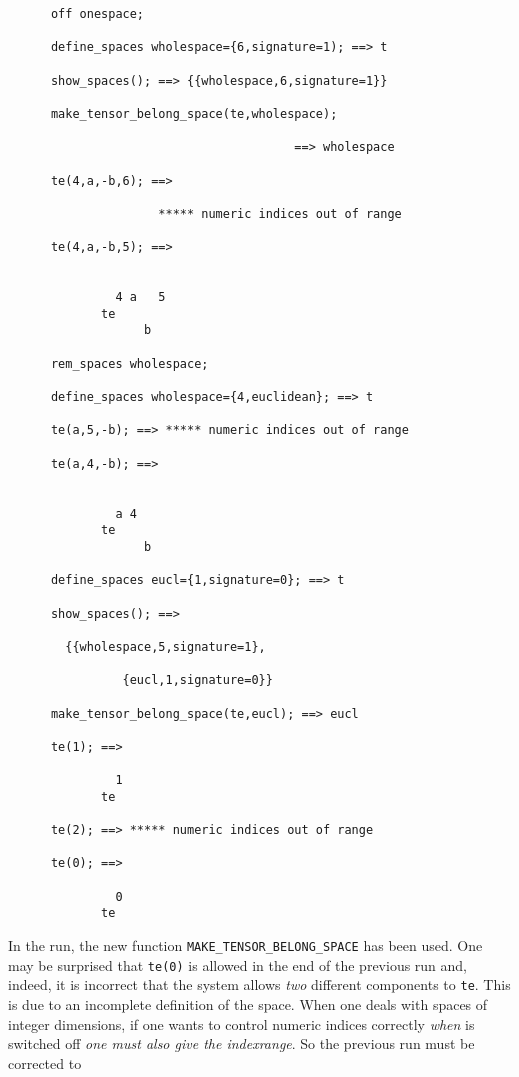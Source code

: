 \begin{verbatim}
      off onespace;

      define_spaces wholespace={6,signature=1); ==> t

      show_spaces(); ==> {{wholespace,6,signature=1}}

      make_tensor_belong_space(te,wholespace);

                                        ==> wholespace

      te(4,a,-b,6); ==>

                     ***** numeric indices out of range

      te(4,a,-b,5); ==>


               4 a   5
             te
                   b

      rem_spaces wholespace;

      define_spaces wholespace={4,euclidean}; ==> t

      te(a,5,-b); ==> ***** numeric indices out of range

      te(a,4,-b); ==>


               a 4
             te
                   b

      define_spaces eucl={1,signature=0}; ==> t

      show_spaces(); ==> 

        {{wholespace,5,signature=1},
 
                {eucl,1,signature=0}}

      make_tensor_belong_space(te,eucl); ==> eucl

      te(1); ==>

               1
             te

      te(2); ==> ***** numeric indices out of range

      te(0); ==> 

               0
             te
\end{verbatim} 
In the run, the new function 
\texttt{MAKE\_TENSOR\_BELONG\_SPACE}
has been used.
One may be surprised that \texttt{te(0)} is allowed in the end of 
the previous run and, indeed,
it is incorrect that the system allows \emph{two} different components to
\texttt{te}.
This is due to an incomplete definition of the space. When one deals
with spaces of integer dimensions, if one wants to control numeric indices
correctly \emph{when}  is switched off \emph{one must also give the 
indexrange}.
So the previous run must be corrected to
